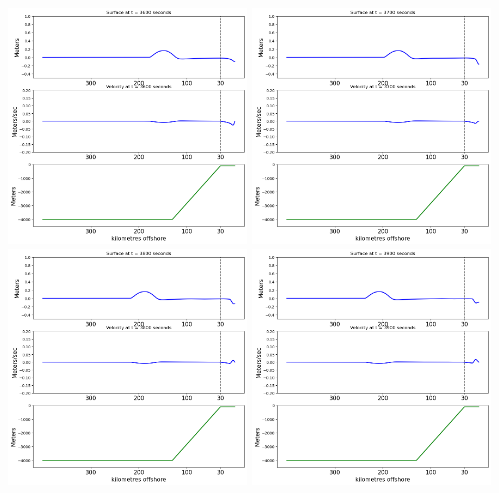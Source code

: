 \documentclass[11pt]{article}
\begin{document}
\vskip 10pt 
\includegraphics[width=0.475\textwidth]{frame0036fig2.png}
\vskip 10pt 
\includegraphics[width=0.475\textwidth]{frame0037fig2.png}
\vskip 10pt 
\includegraphics[width=0.475\textwidth]{frame0038fig2.png}
\vskip 10pt 
\includegraphics[width=0.475\textwidth]{frame0039fig2.png}
\end{document}
